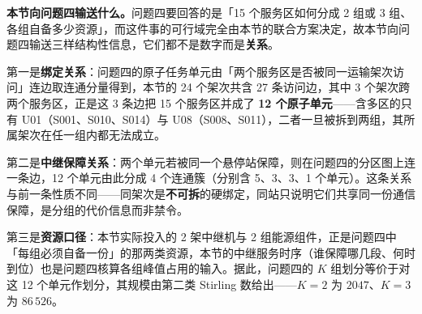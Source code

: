 \textbf{本节向问题四输送什么。}问题四要回答的是「15 个服务区如何分成 2 组或 3 组、各组自备多少资源」，而这件事的可行域完全由本节的联合方案决定，故本节向问题四输送三样结构性信息，它们都不是数字而是\textbf{关系}。

第一是\textbf{绑定关系}：问题四的原子任务单元由「两个服务区是否被同一运输架次访问」连边取连通分量得到，本节的 24 个架次共含 27 条访问边，其中 3 个架次跨两个服务区，正是这 3 条边把 15 个服务区并成了 \textbf{12 个原子单元}——含多区的只有 U01（S001、S010、S014）与 U08（S008、S011），二者一旦被拆到两组，其所属架次在任一组内都无法成立。

第二是\textbf{中继保障关系}：两个单元若被同一个悬停站保障，则在问题四的分区图上连一条边，12 个单元由此分成 4 个连通簇（分别含 5、3、3、1 个单元）。这条关系与前一条性质不同——同架次是\textbf{不可拆}的硬绑定，同站只说明它们共享同一份通信保障，是分组的代价信息而非禁令。

第三是\textbf{资源口径}：本节实际投入的 2 架中继机与 2 组能源组件，正是问题四中「每组必须自备一份」的那两类资源，本节的中继服务时序（谁保障哪几段、何时到位）也是问题四核算各组峰值占用的输入。据此，问题四的 $K$ 组划分等价于对这 12 个单元作划分，其规模由第二类 Stirling 数给出——$K=2$ 为 $2047$、$K=3$ 为 $86\,526$。
